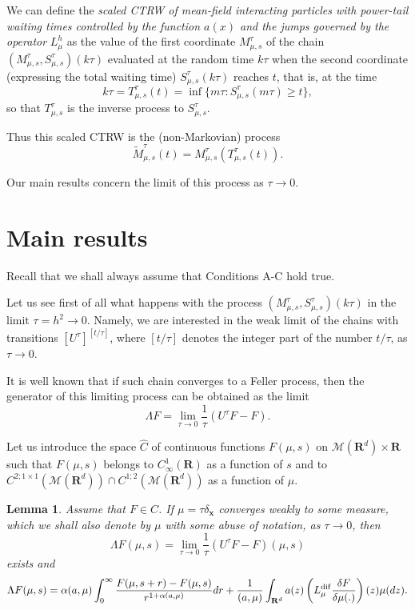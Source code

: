 \documentclass[12pt]{article}
\def\MC{\mathcal{M}}
\def\R{\mathbf{R}}
\def\x{\mathbf{x}}
\def\al{\alpha}
\def\de{\delta}
\newcommand{\La}{\Lambda}
\numberwithin{equation}{section}
\newtheorem{lemma}{Lemma}
\begin{document}
We can define the {\it scaled CTRW of mean-field interacting particles
with power-tail waiting times controlled by the function $a(x)$
and the jumps governed by the operator} $L_{\mu}^h$ as
the value of the first coordinate $M^{\tau}_{\mu,s}$  of the chain
$(M^{\tau}_{\mu,s},S^{\tau}_{\mu,s})(k\tau)$
evaluated at the random time $k\tau$ when the second coordinate
(expressing the total waiting time) $S^{\tau}_{\mu,s}(k\tau)$
reaches $t$, that is, at the time
\[
k\tau =T_{\mu,s}^{\tau}(t)=\inf \{ m\tau: S^{\tau}_{\mu,s} (m\tau) \ge t\},
\]
so that $T_{\mu,s}^{\tau}$ is the inverse process to $S^{\tau}_{\mu,s}$.

Thus this scaled CTRW is the (non-Markovian) process
 \begin{equation}
\label{scaledmfchainwithtail}
\tilde M^{\tau}_{\mu,s}(t)= M^{\tau}_{\mu,s}(T_{\mu,s}^{\tau}(t)).
\end{equation}

Our main results concern the limit of this process as $\tau\to 0$.

\section{Main results}
\label{mainresults}

Recall that we shall always assume that Conditions A-C hold true.

Let us see first of all what happens with the process $(M^{\tau}_{\mu,s},S^{\tau}_{\mu,s})(k\tau)$
in the limit $\tau =h^2\to 0$.  Namely, we are interested
in the weak limit of the chains with transitions
 $[U^{\tau}]^{[t/\tau]}$, where $[t/\tau]$ denotes the integer
 part of the number $t/\tau$, as $\tau\to 0$.


It is well known \cite{Ko11,Kal}  that if such chain converges
to a Feller process, then the generator of this limiting process
can be obtained as the limit
 \begin{equation}
\label{scalingMchainsrep}
\La F= \lim_{\tau\to 0} \frac{1}{\tau}(U^{\tau}F-F).
\end{equation}

Let us introduce the space $\hat C$ of continuous functions $F(\mu,s)$ on $\MC(\R^d)\times \R$ such that
 $F(\mu,s)$ belongs to $C^1_{\infty}(\R)$ as a function of $s$ and to $C^{2;1\times 1}(\MC(\R^d))\cap C^{1;2}(\MC(\R^d))$
 as a function of $\mu$.

\begin{lemma}
\label{lem1}
Assume that $F\in \hat C$. If $\mu=\tau \de_{\x}$ converges
weakly to some measure, which we shall also denote by $\mu$ with some abuse of notation, as $\tau\to 0$, then
 \[
\La F(\mu,s)= \lim_{\tau\to 0} \frac{1}{\tau}(U^{\tau}F-F)(\mu,s)
\]
exists and
 \begin{equation}
\label{eq1lem1}
\La F(\mu,s)=\al (a,\mu) \int_0^{\infty} \frac {F(\mu, s+r)-F(\mu,s)}{r^{1+\al (a, \mu)}} dr
+\frac{1}{(a,\mu)}\int_{\R^d} a(z)\left(L_{\mu}^{\rm dif} \frac{\de F}{\de \mu(.)}\right)(z)\mu(dz).
\end{equation}
\end{lemma}
\end{document}
